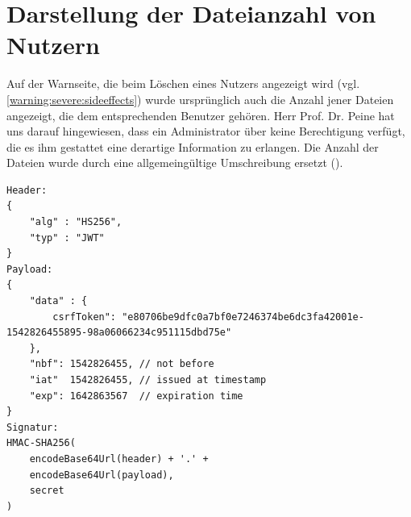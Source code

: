 \documentclass[12pt,DIV14,BCOR10mm,a4paper,parskip=half-,headsepline,headinclude,english,ngerman,bibliography=totocnumbered]{scrreprt}
\begin{document}
\section{Darstellung der Dateianzahl von Nutzern}
Auf der Warnseite, die beim Löschen eines Nutzers angezeigt wird (vgl. \ref{warning:severe:sideeffects}) wurde ursprünglich auch die Anzahl jener Dateien angezeigt, die dem entsprechenden Benutzer gehören. Herr Prof. Dr. Peine hat uns darauf hingewiesen, dass ein Administrator über keine Berechtigung verfügt, die es ihm gestattet eine derartige Information zu erlangen. Die Anzahl der Dateien wurde durch eine allgemeingültige Umschreibung ersetzt ().


\printbibliography

\printacronyms[title=Abkürzungsverzeichnis,toctitle=Abkürzungsverzeichnis]
\printglossary[title=Glossar,toctitle=Glossar,type=main]

\iftotalfigures
  \listoffigures
\fi


\begin{appendices}

\begin{lstlisting}[label=jwtformat, caption={Aufbau eines JSON Web Token},captionpos=b]
Header:
{
	"alg" : "HS256",
	"typ" : "JWT"
}
Payload:
{
	"data" : {
		csrfToken": "e80706be9dfc0a7bf0e7246374be6dc3fa42001e-1542826455895-98a06066234c951115dbd75e"
	},
	"nbf": 1542826455, // not before
	"iat"  1542826455, // issued at timestamp
	"exp": 1642863567  // expiration time
}
Signatur:
HMAC-SHA256(
	encodeBase64Url(header) + '.' +
	encodeBase64Url(payload),
	secret
)
\end{lstlisting}

\end{appendices}
\end{document}
